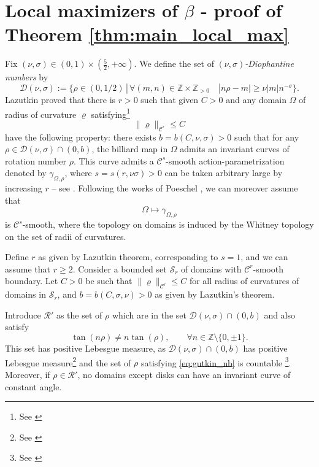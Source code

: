 \documentclass[a4paper]{article}
\theoremstyle{definition}
\def\Z{\mathbb{Z}}
\begin{document}
\section{Local maximizers of $\beta$ - proof of Theorem \ref{thm:main_local_max}}

Fix $(\nu,\sigma)\in(0,1)\times(\frac{5}{2},+\infty)$. We define the set of \textit{$(\nu,\sigma)$-Diophantine numbers} by
\[
\mathcal D(\nu,\sigma) := \{ \rho\in (0,1/2) \,|\, \forall (m,n)\in\Z\times\Z_{>0}
\quad |n\rho-m|\geq \nu |m| n^{-\sigma}\}.
\]
Lazutkin \cite[Theorem 2]{Lazutkin_KAM} proved that there is $r>0$ such that given $C>0$ and any domain $\Omega$ of radius of curvature $\varrho$ satisfying\footnote{See \cite[Formula (1.7)]{Lazutkin_KAM}}
\[
\|\varrho\|_{\mathscr C^r}\leq C
\]
have the following property: 
there exists $b=b(C,\nu,\sigma)>0$ such that for any $\rho\in\mathcal{D}(\nu,\sigma)\cap(0,b)$, the billiard map in $\Omega$ admits an invariant curves of rotation number $\rho$. This curve admits a $\mathscr C^s$-smooth action-parametrization denoted by $\gamma_{\Omega,\rho}$, where $s=s(r,\nu\sigma)>0$ can be taken arbitrary large by increasing $r$ -- see \cite[Formula (1.6)]{Lazutkin_KAM}. Following the works of Poeschel \cite{Poeschel1, Poeschel2}, we can moreover assume that 
\[
\Omega\mapsto\gamma_{\Omega,\rho}
\]
is $\mathscr C^s$-smooth, where the topology on domains is induced by the Whitney topology on the set of radii of curvatures.
\vspace{0.2cm}

Define $r$ as given by Lazutkin theorem, corresponding to $s=1$, and we can assume that $r\geq 2$. Consider a bounded set $\mathscr S_r$ of domains with $\mathscr C^r$-smooth boundary. Let $C>0$ be such that $\|\varrho\|_{\mathscr C^r}\leq C$ for all radius of curvatures of domains in $\mathscr S_r$, and $b=b(C,\sigma,\nu)>0$ as given by Lazutkin's theorem.

Introduce $\mathscr R'$ as the set of $\rho$ which are in the set $\mathcal{D}(\nu,\sigma)\cap(0,b)$ and also satisfy
\begin{equation}
\label{eq:gutkin_nb}
\tan(n\rho) \neq n\tan(\rho),\qquad\forall n\in\Z\setminus\{0,\pm 1\}.
\end{equation}
This set has positive Lebesgue measure, as $\mathcal{D}(\nu,\sigma)\cap(0,b)$ has positive Lebesgue measure\footnote{See \cite[Formula (0.3)]{Lazutkin_KAM}}  and the set of $\rho$ satisfying \eqref{eq:gutkin_nb} is countable \footnote{See \cite[Corollary 2]{Gutkin}}. Moreover, if $\rho\in\mathscr R'$, no domains except disks can have an invariant curve of constant angle.
\vspace{0.2cm}
\end{document}
